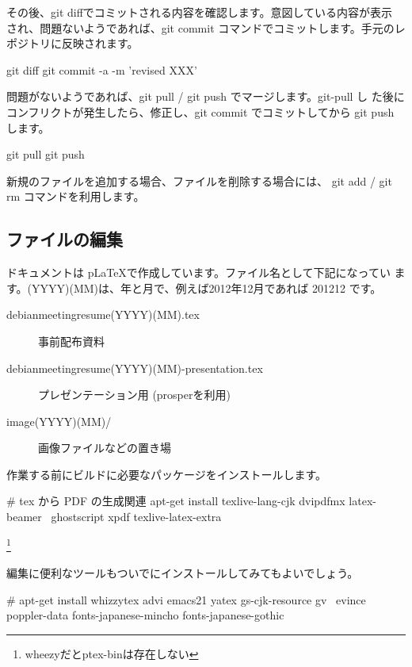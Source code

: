 \documentclass[mingoth,a4paper]{jsarticle}
\begin{document}
その後、git diffでコミットされる内容を確認します。意図している内容が表示
され、問題ないようであれば、git commit コマンドでコミットします。手元のレ
ポジトリに反映されます。

\begin{commandline}
 git diff
 git commit -a -m 'revised XXX'
\end{commandline}

問題がないようであれば、git pull / git push でマージします。git-pull し
た後にコンフリクトが発生したら、修正し、git commit でコミットしてから
git push します。

\begin{commandline}
 git pull 
 git push 
\end{commandline}

新規のファイルを追加する場合、ファイルを削除する場合には、 git add /
git rm コマンドを利用します。

\subsection{ファイルの編集}

ドキュメントは p\LaTeX{}で作成しています。ファイル名として下記になってい
ます。(YYYY)(MM)は、年と月で、例えば2012年12月であれば 201212 です。

\begin{description}
 \item[debianmeetingresume(YYYY)(MM).tex]
	    事前配布資料
 \item[debianmeetingresume(YYYY)(MM)-presentation.tex]
	    プレゼンテーション用 (prosperを利用)
 \item[image(YYYY)(MM)/]
	    画像ファイルなどの置き場
\end{description}

作業する前にビルドに必要なパッケージをインストールします。

\begin{commandline}
# tex から PDF の生成関連
apt-get install texlive-lang-cjk dvipdfmx latex-beamer \
 ghostscript xpdf texlive-latex-extra 
\end{commandline}
\footnote{wheezyだとptex-binは存在しない}

編集に便利なツールもついでにインストールしてみてもよいでしょう。

\begin{commandline}
# apt-get install whizzytex advi emacs21 yatex gs-cjk-resource gv \
  evince poppler-data fonts-japanese-mincho fonts-japanese-gothic
\end{commandline}
\end{document}
